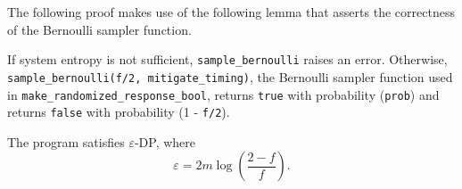 \documentclass{article}
\begin{document}
\begin{tcolorbox} 
\begin{note} 
The following proof makes use of the following lemma that asserts the correctness of the Bernoulli sampler function. 
    \begin{lemma} 
    If system entropy is not sufficient, \texttt{sample\_bernoulli} raises an error.  
    Otherwise, \texttt{sample\_bernoulli(f/2, mitigate\_timing)}, the Bernoulli sampler function used in \texttt{make\_randomized\_response\_bool},  
    returns \texttt{true} with probability (\texttt{prob}) and returns  \texttt{false} with probability (1 - \texttt{f/2}). 
    \end{lemma} 
\end{note} 
\end{tcolorbox} 
\begin{theorem} 
\label{thm:privacy-parameter} 
	The program  satisfies $\varepsilon$-DP, where  
	\begin{equation*} 
		\varepsilon = 2m\log\left(\frac{2-f}{f}\right). 
	\end{equation*} 
\end{theorem} 
\end{document}
